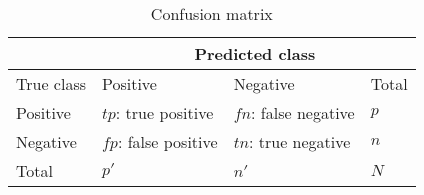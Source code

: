 \begin{table}[ht]
    \centering
    \begin{tabular}{ |l|l|l|l| }\hline
                    &   \multicolumn{3}{c|}{Predicted class}\\\hline
        True class  &  Positive             & Negative              & Total \\\hline
        Positive    & $tp$: true positive   & $fn$: false negative  & $p$   \\
        Negative    & $fp$: false positive  & $tn$: true negative   & $n$   \\\hline
        Total       & $p'$                  & $n'$                  & $N$   \\\hline
    \end{tabular}
    \caption{Confusion matrix}
    \label{tab:confmat}
\end{table}